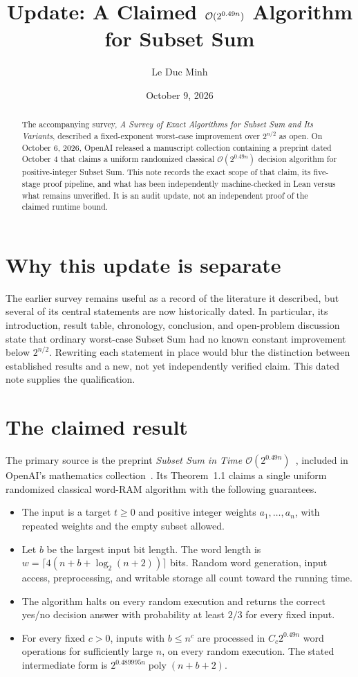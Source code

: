 \documentclass[11pt]{article}
\title{Update: A Claimed $\Oh(2^{0.49n})$ Algorithm for Subset Sum}
\author{Le Duc Minh}
\date{October 9, 2026}
\newcommand{\Oh}{\mathcal{O}}
\begin{document}
\maketitle

\begin{abstract}
The accompanying survey, \emph{A Survey of Exact Algorithms for Subset Sum and
Its Variants}, described a fixed-exponent worst-case improvement over $2^{n/2}$
as open. On October 6, 2026, OpenAI released a manuscript collection containing
a preprint dated October 4 that claims a uniform randomized classical
$\Oh(2^{0.49n})$ decision algorithm for positive-integer Subset Sum. This note
records the exact scope of that claim, its five-stage proof pipeline, and what
has been independently machine-checked in Lean versus what remains unverified.
It is an audit update, not an independent proof of the claimed runtime bound.
\end{abstract}

\section{Why this update is separate}

The earlier survey remains useful as a record of the literature it described,
but several of its central statements are now historically dated. In
particular, its introduction, result table, chronology, conclusion, and
open-problem discussion state that ordinary worst-case Subset Sum had no known
constant improvement below $2^{n/2}$. Rewriting each statement in place would
blur the distinction between established results and a new, not yet
independently verified claim. This dated note supplies the qualification.

\section{The claimed result}

The primary source is the preprint \emph{Subset Sum in Time
$\Oh(2^{0.49n})$}~\cite{openai-ss}, included in OpenAI's mathematics
collection~\cite{openai-release}. Its Theorem~1.1 claims a single uniform
randomized classical word-RAM algorithm with the following guarantees.

\begin{itemize}
\item The input is a target $t\geq 0$ and positive integer weights
  $a_1,\ldots,a_n$, with repeated weights and the empty subset allowed.
\item Let $b$ be the largest input bit length. The word length is
  $w=\lceil4(n+b+\log_2(n+2))\rceil$ bits. Random word generation, input
  access, preprocessing, and writable storage all count toward the running
  time.
\item The algorithm halts on every random execution and returns the correct
  yes/no decision answer with probability at least $2/3$ for every fixed input.
\item For every fixed $c>0$, inputs with $b\leq n^c$ are processed in
  $C_c2^{0.49n}$ word operations for sufficiently large $n$, on every random
  execution. The stated intermediate form is
  $2^{0.489995n}\operatorname{poly}(n+b+2)$.
\end{itemize}
\end{document}
